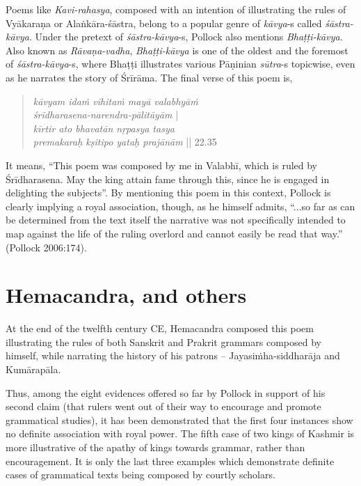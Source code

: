 Poems like {\sl Kavi-rahasya}, composed with an intention of illustrating the rules of Vyākaraṇa or Alaṅkāra-śāstra, belong to a popular genre of {\sl kāvya}-s called {\sl śāstra-kāvya}. Under the pretext of {\sl śāstra-kāvya}-s, Pollock also mentions {\sl Bhaṭṭi-kāvya}. Also known as {\sl Rāvaṇa-vadha}, {\sl Bhaṭṭi-kāvya} is one of the oldest and the foremost of {\sl śāstra-kāvya}-s, where Bhaṭṭi illustrates various Pāṇinian {\sl sūtra}-s topicwise, even as he narrates the story of Śrīrāma. The final verse of this poem is,
\begin{quote}
{{\sl kāvyam idaṁ vihitaṁ mayā valabhyāṁ}}\\[2pt]
\phantom{\quad} {{\sl śrīdharasena-narendra-pālitāyām}} |\\[2pt]
{{\sl kīrtir ato bhavatān nṛpasya tasya}}\\[2pt] 
\phantom{\quad} {{\sl  premakaraḥ kṣitipo yataḥ prajānām}} || 22.35 
\end{quote}
It means, ``This poem was composed by me in Valabhī, which is ruled by Śrīdharasena. May the king attain fame through this, since he is engaged in delighting the subjects''. By mentioning this poem in this context, Pollock is clearly implying a royal association, though, as he himself admits, ``...so far as can be determined from the text itself the narrative was not specifically intended to map against the life of the ruling overlord and cannot easily be read that way.'' (Pollock 2006:174). 

\section{Hemacandra, and others}\label{chap3-sec15}

At the end of the twelfth century CE, Hemacandra composed this poem illustrating the rules of both Sanskrit and Prakrit grammars composed by himself, while narrating the history of his patrons -- Jayasiṁha-siddharāja and Kumārapāla.

Thus, among the eight evidences offered so far by Pollock in support of his second claim (that rulers went out of their way to encourage and promote grammatical studies), it has been demonstrated that the first four instances show no definite association with royal power. The fifth case of two kings of Kashmir is more illustrative of the apathy of kings towards grammar, rather than encouragement. It is only the last three examples which demonstrate definite cases of grammatical texts being composed by courtly scholars.

